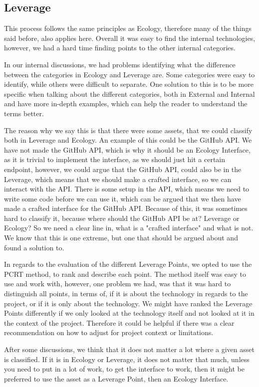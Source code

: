 \subsection{Leverage}
This process follows the same principles as Ecology, therefore many of the things said before, also applies here.
Overall it was easy to find the internal technologies, however, we had a hard time finding points to the other internal categories.

In our internal discussions, we had problems identifying what the difference between the categories in Ecology and Leverage are.
Some categories were easy to identify, while others were difficult to separate.
One solution to this is to be more specific when talking about the different categories, both in External and Internal and have more in-depth examples, which can help the reader to understand the terms better.

The reason why we say this is that there were some assets, that we could classify both in Leverage and Ecology.
An example of this could be the GitHub API.
We have not made the GitHub API, which is why it should be an Ecology Interface, as it is trivial to implement the interface, as we should just hit a certain endpoint, however, we could argue that the GitHub API, could also be in the Leverage, which means that we should make a crafted interface, so we can interact with the API.
There is some setup in the API, which means we need to write some code before we can use it, which can be argued that we then have made a crafted interface for the GitHub API.
Because of this, it was sometimes hard to classify it, because where should the GitHub API be at? 
Leverage or Ecology?
So we need a clear line in, what is a "crafted interface" and what is not.
We know that this is one extreme, but one that should be argued about and found a solution to.  

In regards to the evaluation of the different Leverage Points, we opted to use the PCRT method, to rank and describe each point.
The method itself was easy to use and work with, however, one problem we had, was that it was hard to distinguish all points, in terms of, if it is about the technology in regards to the project, or if it is only about the technology.
We might have ranked the Leverage Points differently if we only looked at the technology itself and not looked at it in the context of the project.
Therefore it could be helpful if there was a clear recommendation on how to adjust for project context or limitations.

After some discussions, we think that it does not matter a lot where a given asset is classified.
If it is in Ecology or Leverage, it does not matter that much, unless you need to put in a lot of work, to get the interface to work, then it might be preferred to use the asset as a Leverage Point, then an Ecology Interface.

